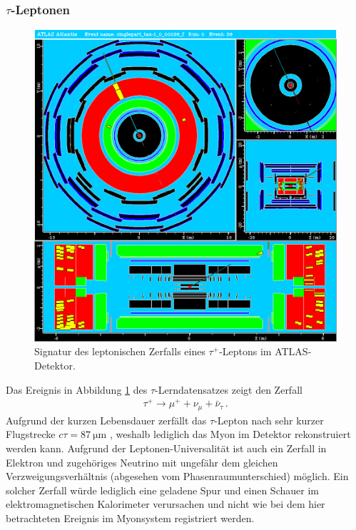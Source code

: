 \documentclass[11pt, a4paper]{article}
\numberwithin{equation}{section}
\begin{document}
\subsubsection{$\tau$-Leptonen}
\begin{figure}[htbp]
	\centering
	\includegraphics[width=1.0\textwidth]{./data/atlantis/singlepart_events_new/tau/muon.png}
	\caption{Signatur des leptonischen Zerfalls eines $\tau^+$-Leptons im ATLAS-Detektor.}
	\label{fig:tau-muon}
\end{figure}
\vfill
\noindent
Das Ereignis in Abbildung \ref{fig:tau-muon} des $\tau$-Lerndatensatzes zeigt den Zerfall
\begin{align*}
	\tau^+ \rightarrow \mu^+ + \nu_\mu + \bar{\nu}_\tau \, \text{.}
\end{align*}
Aufgrund der kurzen Lebensdauer zerfällt das $\tau$-Lepton nach sehr kurzer Flugstrecke $c \tau = \SI{87}{\micro\meter}$ \cite{pdg}, weshalb lediglich das Myon im Detektor rekonstruiert werden kann.
Aufgrund der Leptonen-Universalität ist auch ein Zerfall in Elektron und zugehöriges Neutrino  mit ungefähr dem gleichen Verzweigungsverhältnis (abgesehen vom Phasenraumunterschied) möglich.
Ein solcher Zerfall würde lediglich eine geladene Spur und einen Schauer im elektromagnetischen Kalorimeter verursachen und nicht wie bei dem hier betrachteten Ereignis im Myonsystem registriert werden.
\end{document}
